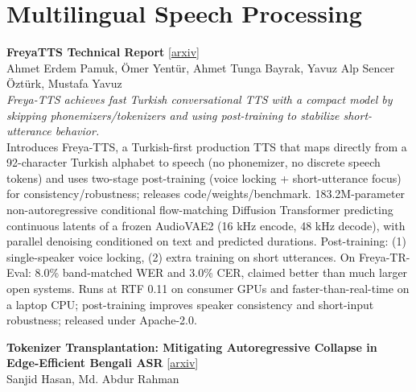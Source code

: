 \documentclass[12pt,letterpaper]{article}
\begin{document}
\medskip


\section*{Multilingual Speech Processing}

{\small\textbf{FreyaTTS Technical Report}} {\scriptsize[\href{https://arxiv.org/abs/2607.09530}{arxiv}]}\\
{\scriptsize Ahmet Erdem Pamuk, \"Omer Yent\"ur, Ahmet Tunga Bayrak, Yavuz Alp Sencer \"Ozt\"urk, Mustafa Yavuz}\\

{\small\textit{Freya-TTS achieves fast Turkish conversational TTS with a compact model by skipping phonemizers/tokenizers and using post-training to stabilize short-utterance behavior.}}\\[1pt]
{\footnotesize Introduces Freya-TTS, a Turkish-first production TTS that maps directly from a 92-character Turkish alphabet to speech (no phonemizer, no discrete speech tokens) and uses two-stage post-training (voice locking + short-utterance focus) for consistency/robustness; releases code/weights/benchmark. 183.2M-parameter non-autoregressive conditional flow-matching Diffusion Transformer predicting continuous latents of a frozen AudioVAE2 (16 kHz encode, 48 kHz decode), with parallel denoising conditioned on text and predicted durations. Post-training: (1) single-speaker voice locking, (2) extra training on short utterances. On Freya-TR-Eval: 8.0\% band-matched WER and 3.0\% CER, claimed better than much larger open systems. Runs at RTF 0.11 on consumer GPUs and faster-than-real-time on a laptop CPU; post-training improves speaker consistency and short-input robustness; released under Apache-2.0.}

\medskip

{\small\textbf{Tokenizer Transplantation: Mitigating Autoregressive Collapse in Edge-Efficient Bengali ASR}} {\scriptsize[\href{https://arxiv.org/abs/2607.09598}{arxiv}]}\\
{\scriptsize Sanjid Hasan, Md. Abdur Rahman}\\
\end{document}
